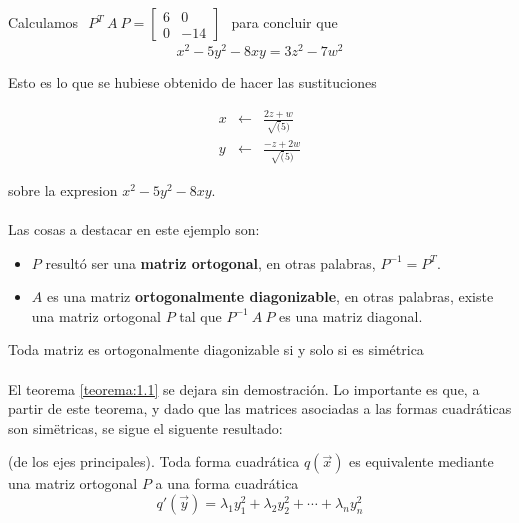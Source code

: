 \begin{example}
Calculamos $ \begin{matrix} 
    P^{T}~A~P = \begin{bmatrix}
6 & 0\\
0 & -14
\end{bmatrix}
    \end{matrix}$ para concluir que 
\begin{equation*}
x^{2} - 5y^{2} - 8xy = 3z^{2} - 7w^{2}
\end{equation*}

Esto es lo que se hubiese obtenido de hacer las sustituciones 

\begin{eqnarray*}
x & \leftarrow & \frac{2z + w}{\sqrt(5)}\\
y & \leftarrow & \frac{-z + 2w}{\sqrt(5)}
\end{eqnarray*}

sobre la expresion $x^{2} - 5y^{2} - 8xy$.
\end{example}

\paragraph*{}
Las cosas a destacar en este ejemplo son:
\begin{itemize}
    \item $P$ resultó ser una \textbf{matriz ortogonal}, en otras palabras, $P^{-1} = P^{T}$.
    \item $A$ es una matriz \textbf{ortogonalmente diagonizable}, en otras palabras, existe una matriz ortogonal $P$ tal que $P^{-1}~A~P$ es una matriz diagonal.
\end{itemize}

\begin{theorem}
Toda matriz es ortogonalmente diagonizable si y solo si es simétrica
\label{teorema:1.1}
\end{theorem}

\paragraph*{}
El teorema \ref{teorema:1.1} se dejara sin demostración. Lo importante es que, a partir de este teorema, y dado que las matrices asociadas a las formas cuadráticas son simëtricas, se sigue el siguente resultado:

\begin{theorem}(de los ejes principales).
Toda forma cuadrática $q(\overrightarrow{x})$ es equivalente mediante una matriz ortogonal $P$ a una forma cuadrática 
\begin{equation}
    q'(\overrightarrow{y}) = \lambda_{1}y_{1}^{2} + \lambda_{2}y_{2}^{2} + \cdots + \lambda_{n}y_{n}^{2}
\end{equation}
\label{teorema:1.2}
\end{theorem}

